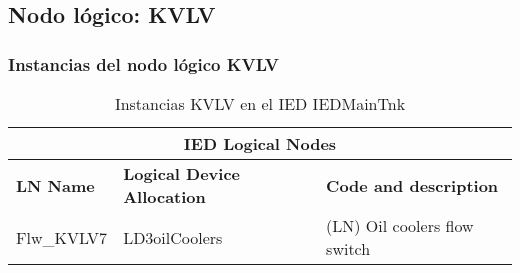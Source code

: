 
\subsection{Nodo l\'ogico: 			 KVLV}

    \subsubsection{Instancias del nodo l\'ogico KVLV}
    \begin{table}[H]
    \begin{center}
    \begin{tabular}{|l|l|p{6.8cm}|}
            \hline
            \multicolumn{3}{|c|}{\cellcolor[gray]{0.8} \textbf{IED Logical Nodes} } \\
            \hline
            \textbf{LN Name} & \textbf{Logical Device Allocation} & \textbf{Code and description} \\
            \hline
            Flw\_KVLV7 & LD3oilCoolers & (LN) Oil coolers flow switch \\
            \hline
    \end{tabular}
    \caption{Instancias KVLV en el IED IEDMainTnk}
    \label{table:lnInstKVLV_switch}
    \end{center}
    \end{table}
    
    
    
